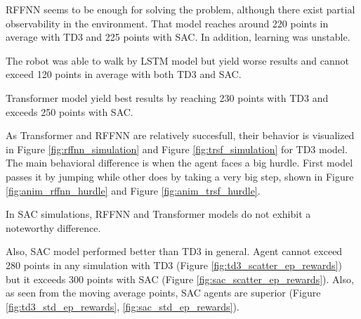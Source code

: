 \documentclass[a4paper, 12pt]{article} %
\begin{document}
RFFNN seems to be enough for solving the problem, although there exist partial observability in the environment. 
That model reaches around 220 points in average with TD3 and 225 points with SAC. In addition, learning was unstable. 

The robot was able to walk by LSTM model but yield worse results and cannot exceed 120 points in average with both TD3 and SAC. 

Transformer model yield best results by reaching 230 points with TD3 and exceeds 250 points with SAC. 

As Transformer and RFFNN are relatively succesfull, their behavior is visualized in Figure \ref{fig:rffnn_simulation} and Figure \ref{fig:trsf_simulation} for TD3 model. 
The main behavioral difference is when the agent faces a big hurdle. 
First model passes it by jumping while other does by taking a very big step, shown in Figure \ref{fig:anim_rffnn_hurdle} and Figure \ref{fig:anim_trsf_hurdle}.

In SAC simulations, RFFNN and Transformer models do not exhibit a noteworthy difference.

Also, SAC model performed better than TD3 in general. 
Agent cannot exceed 280 points in any simulation with TD3 (Figure \ref{fig:td3_scatter_ep_rewards}) but it exceeds 300 points with SAC (Figure \ref{fig:sac_scatter_ep_rewards}). Also, as seen from the moving average points, SAC agents are superior (Figure \ref{fig:td3_std_ep_rewards}, \ref{fig:sac_std_ep_rewards}).
\end{document}
